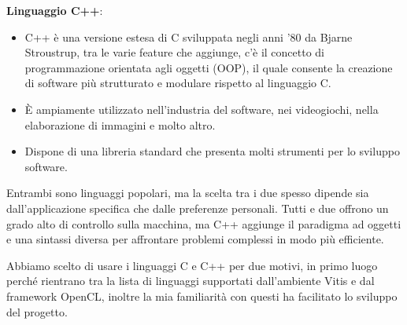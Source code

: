 \vspace{0,3cm}
\noindent \textbf{Linguaggio C++}:
\begin{itemize}
    \item C++ è una versione estesa di C sviluppata negli anni '80 da Bjarne Stroustrup, tra le varie feature che aggiunge, c'è il concetto di programmazione orientata agli oggetti (OOP), il quale consente la creazione di software più strutturato e modulare rispetto al linguaggio C.
    \item È ampiamente utilizzato nell'industria del software, nei videogiochi, nella elaborazione di immagini e molto altro.
    \item Dispone di una libreria standard che presenta molti strumenti per lo sviluppo software. 

\end{itemize}

\vspace{0,3cm}
\vspace{0,3cm}

\noindent Entrambi sono linguaggi popolari, ma la scelta tra i due spesso dipende sia dall'applicazione specifica che dalle preferenze personali.
Tutti e due offrono un grado alto di controllo sulla macchina, ma C++ aggiunge il paradigma ad oggetti e una sintassi diversa per affrontare problemi complessi in modo più efficiente.

\vspace{0,3cm}

\noindent Abbiamo scelto di usare i linguaggi C e C++ per due motivi, in primo luogo perché rientrano tra la lista di linguaggi supportati dall'ambiente Vitis e dal framework OpenCL, inoltre la mia familiarità con questi ha facilitato lo sviluppo del progetto.




